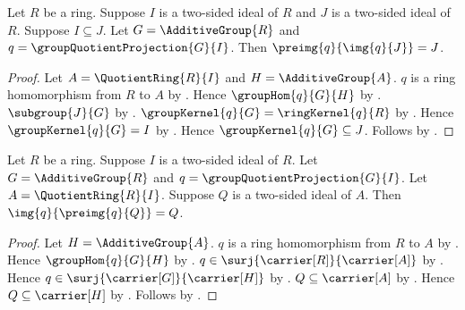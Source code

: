 \begin{theorem}\label{ring_quotient_correspondence_preimage_image}
    Let $R$ be a ring.
    Suppose $I$ is a two-sided ideal of $R$ and
        $J$ is a two-sided ideal of $R$.
    Suppose $I\subseteq J$.
    Let $G=\AdditiveGroup{R}$ and
        $q=\groupQuotientProjection{G}{I}$.
    Then $\preimg{q}{\img{q}{J}}=J$.
\end{theorem}
\begin{proof}
    Let $A=\QuotientRing{R}{I}$ and
        $H=\AdditiveGroup{A}$.
    $q$ is a ring homomorphism from $R$ to $A$ by
        .
    Hence $\groupHom{q}{G}{H}$ by
        .
    $\subgroup{J}{G}$ by
        .
    $\groupKernel{q}{G}=\ringKernel{q}{R}$ by
        .
    Hence $\groupKernel{q}{G}=I$ by
        .
    Hence $\groupKernel{q}{G}\subseteq J$.
    Follows by .
\end{proof}

\begin{theorem}\label{ring_quotient_correspondence_image_preimage}
    Let $R$ be a ring.
    Suppose $I$ is a two-sided ideal of $R$.
    Let $G=\AdditiveGroup{R}$ and
        $q=\groupQuotientProjection{G}{I}$.
    Let $A=\QuotientRing{R}{I}$.
    Suppose $Q$ is a two-sided ideal of $A$.
    Then $\img{q}{\preimg{q}{Q}}=Q$.
\end{theorem}
\begin{proof}
    Let $H=\AdditiveGroup{A}$.
    $q$ is a ring homomorphism from $R$ to $A$ by
        .
    Hence $\groupHom{q}{G}{H}$ by
        .
    $q\in\surj{\carrier[R]}{\carrier[A]}$ by
        .
    Hence $q\in\surj{\carrier[G]}{\carrier[H]}$ by
        .
    $Q\subseteq\carrier[A]$ by
        .
    Hence $Q\subseteq\carrier[H]$ by
        .
    Follows by .
\end{proof}

